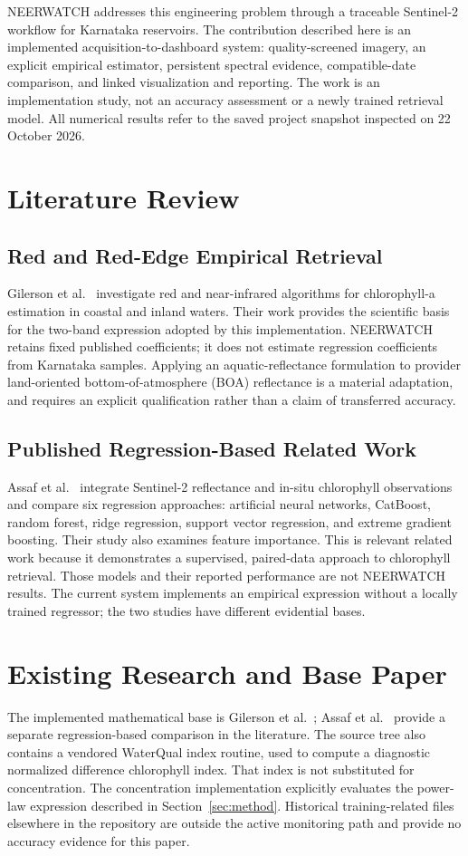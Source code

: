 \documentclass[conference]{IEEEtran}
\begin{document}
NEERWATCH addresses this engineering problem through a traceable Sentinel-2 workflow for Karnataka reservoirs. The contribution described here is an implemented acquisition-to-dashboard system: quality-screened imagery, an explicit empirical estimator, persistent spectral evidence, compatible-date comparison, and linked visualization and reporting. The work is an implementation study, not an accuracy assessment or a newly trained retrieval model. All numerical results refer to the saved project snapshot inspected on 22 October 2026.

\section{Literature Review}
\subsection{Red and Red-Edge Empirical Retrieval}
Gilerson et al.\ \cite{gilerson2010} investigate red and near-infrared algorithms for chlorophyll-a estimation in coastal and inland waters. Their work provides the scientific basis for the two-band expression adopted by this implementation. NEERWATCH retains fixed published coefficients; it does not estimate regression coefficients from Karnataka samples. Applying an aquatic-reflectance formulation to provider land-oriented bottom-of-atmosphere (BOA) reflectance is a material adaptation, and requires an explicit qualification rather than a claim of transferred accuracy.

\subsection{Published Regression-Based Related Work}
Assaf et al.\ \cite{assaf2025} integrate Sentinel-2 reflectance and in-situ chlorophyll observations and compare six regression approaches: artificial neural networks, CatBoost, random forest, ridge regression, support vector regression, and extreme gradient boosting. Their study also examines feature importance. This is relevant related work because it demonstrates a supervised, paired-data approach to chlorophyll retrieval. Those models and their reported performance are not NEERWATCH results. The current system implements an empirical expression without a locally trained regressor; the two studies have different evidential bases.

\section{Existing Research and Base Paper}
The implemented mathematical base is Gilerson et al.\ \cite{gilerson2010}; Assaf et al.\ \cite{assaf2025} provide a separate regression-based comparison in the literature. The source tree also contains a vendored WaterQual index routine\cite{waterqual}, used to compute a diagnostic normalized difference chlorophyll index. That index is not substituted for concentration. The concentration implementation explicitly evaluates the power-law expression described in Section~\ref{sec:method}. Historical training-related files elsewhere in the repository are outside the active monitoring path and provide no accuracy evidence for this paper.
\end{document}
